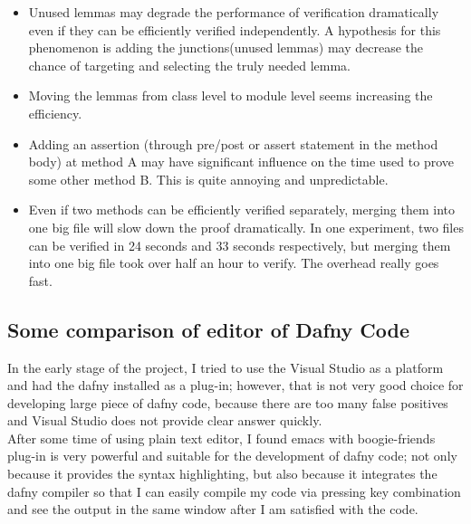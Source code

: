 \begin{itemize}
\item  Unused lemmas may degrade the performance of verification dramatically even if they can be efficiently verified independently. A hypothesis for this phenomenon is adding the junctions(unused lemmas) may decrease the chance of targeting and selecting the truly needed lemma. 

\item Moving the lemmas from class level to module level seems increasing the efficiency.

\item Adding an assertion (through pre/post or assert statement in the method body) at method A may have significant influence on the time used to prove some other method B. This is quite annoying and unpredictable. 

\item Even if two methods can be efficiently verified separately, merging them into one big file will slow down the proof dramatically. In one experiment, two files can be verified in 24 seconds and 33 seconds respectively, but merging them into one big file took over half an hour to verify. The overhead really goes fast.

\end{itemize}

\subsection*{Some comparison of editor of Dafny Code}
In the early stage of the project, I tried to use the Visual Studio as a platform and had the dafny installed as a plug-in; however, that is not very good choice for developing large piece of dafny code, because there are too many false positives and Visual Studio does not provide clear answer quickly.\\

After some time of using plain text editor, I found emacs with boogie-friends plug-in is very powerful and suitable for the development of dafny code; not only because it provides the syntax highlighting, but also because it integrates the dafny compiler so that I can easily compile my code via pressing key combination and see the output in the same window after I am satisfied with the code.\\


 